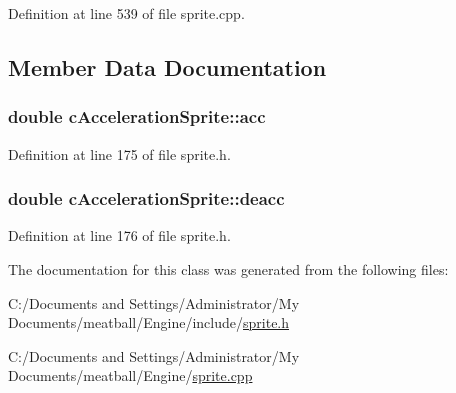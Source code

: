 Definition at line 539 of file sprite.\-cpp.



\subsection{Member Data Documentation}
\hypertarget{classc_acceleration_sprite_aa09f3836673b3b48058edd7ca6876309}{
\subsubsection[{acc}]{\setlength{\rightskip}{0pt plus 5cm}double c\-Acceleration\-Sprite\-::acc}}\label{classc_acceleration_sprite_aa09f3836673b3b48058edd7ca6876309}


Definition at line 175 of file sprite.\-h.

\hypertarget{classc_acceleration_sprite_aabd23a5d522e74532f5870ec8e28eaf6}{
\subsubsection[{deacc}]{\setlength{\rightskip}{0pt plus 5cm}double c\-Acceleration\-Sprite\-::deacc}}\label{classc_acceleration_sprite_aabd23a5d522e74532f5870ec8e28eaf6}


Definition at line 176 of file sprite.\-h.



The documentation for this class was generated from the following files\-:\begin{DoxyCompactItemize}
\item 
C\-:/\-Documents and Settings/\-Administrator/\-My Documents/meatball/\-Engine/include/\hyperlink{sprite_8h}{sprite.\-h}\item 
C\-:/\-Documents and Settings/\-Administrator/\-My Documents/meatball/\-Engine/\hyperlink{sprite_8cpp}{sprite.\-cpp}\end{DoxyCompactItemize}
